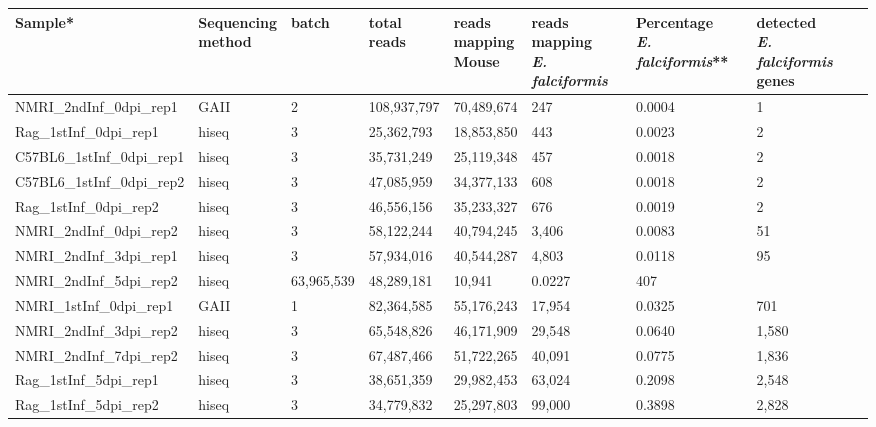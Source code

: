 \documentclass{bmcart}
\begin{document}
\begin{backmatter}
\begin{table}[ht]
\centering
\hspace*{-2.5cm}\begin{tabular}{lllllllll}
  \hline
Sample* & \bcell{Sequencing\\method} & batch & \bcell{total\\reads} & \bcell{reads\\mapping\\Mouse} & \bcell{reads\\mapping\\\textit{E. falciformis}} & \bcell{Percentage\\\textit{E. falciformis}}** & \bcell{detected\\ \textit{E. falciformis}\\genes} \\ 
  \hline
NMRI\_2ndInf\_0dpi\_rep1 & GAII & 2 & 108,937,797 & 70,489,674 & 247 & 0.0004 & 1 \\ 
  Rag\_1stInf\_0dpi\_rep1 & hiseq & 3 & 25,362,793 & 18,853,850 & 443 & 0.0023 & 2 \\ 
  C57BL6\_1stInf\_0dpi\_rep1 & hiseq & 3 & 35,731,249 & 25,119,348 & 457 & 0.0018 & 2 \\ 
  C57BL6\_1stInf\_0dpi\_rep2 & hiseq & 3 & 47,085,959 & 34,377,133 & 608 & 0.0018 & 2 \\ 
  Rag\_1stInf\_0dpi\_rep2 & hiseq & 3 & 46,556,156 & 35,233,327 & 676 & 0.0019 & 2 \\ 
  NMRI\_2ndInf\_0dpi\_rep2 & hiseq & 3 & 58,122,244 & 40,794,245 & 3,406 & 0.0083 & 51 \\ 
  \rowcolor{LightCyan}
  NMRI\_2ndInf\_3dpi\_rep1 & hiseq & 3 & 57,934,016 & 40,544,287 & 4,803 & 0.0118 & 95 \\ 
  \rowcolor{LightCyan}
  NMRI\_2ndInf\_5dpi\_rep2 & hiseq &  63,965,539 & 48,289,181 & 10,941 & 0.0227 & 407 \\ 
  \rowcolor{LightRed}
  NMRI\_1stInf\_0dpi\_rep1 & GAII & 1 & 82,364,585 & 55,176,243 & 17,954 & 0.0325 & 701 \\ 
  NMRI\_2ndInf\_3dpi\_rep2 & hiseq & 3 & 65,548,826 & 46,171,909 & 29,548 & 0.0640 & 1,580 \\ 
  NMRI\_2ndInf\_7dpi\_rep2 & hiseq & 3 & 67,487,466 & 51,722,265 & 40,091 & 0.0775 & 1,836 \\ 
  Rag\_1stInf\_5dpi\_rep1 & hiseq & 3 & 38,651,359 & 29,982,453 & 63,024 & 0.2098 & 2,548 \\ 
  Rag\_1stInf\_5dpi\_rep2 & hiseq & 3 & 34,779,832 & 25,297,803 & 99,000 & 0.3898 & 2,828 \\ 

\end{tabular}
\end{table}
\end{backmatter}
\end{document}
